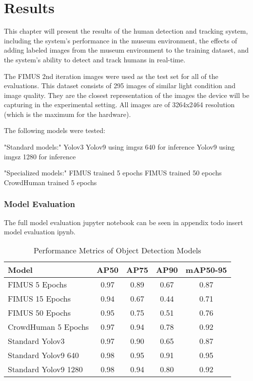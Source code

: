 \section{Results}
\label{sec:results}
This chapter will present the results of the human detection and tracking system, including the system's performance in the museum environment, the effects of adding labeled images from the museum environment to the training dataset, and the system's ability to detect and track humans in real-time.

The FIMUS 2nd iteration images were used as the test set for all of the evaluations. This dataset consists of 295 images of similar light condition and image quality. They are the closest representation of the images the device will be capturing in the experimental setting. All images are of 3264x2464 resolution (which is the maximum for the hardware).

The following models were tested:

"Standard models:"
	Yolov3
	Yolov9 using imgsz 640 for inference
	Yolov9 using imgsz 1280 for inference

"Specialized models:"
	FIMUS trained 5 epochs
	FIMUS trained 50 epochs
	CrowdHuman trained 5 epochs




\subsubsection*{Model Evaluation}
The full model evaluation jupyter notebook can be seen in appendix todo insert model evaluation ipynb.

\begin{table}[H]
    \centering
    \renewcommand{\arraystretch}{1.5} %
    \setlength{\tabcolsep}{1em}
    \begin{tabular}{|l|c|c|c|c|}
        \hline
        \rowcolor{gray!25}
        \textbf{Model} & \textbf{AP50} & \textbf{AP75} & \textbf{AP90} & \textbf{mAP50-95} \\ \hline
        FIMUS 5 Epochs       & 0.97 & 0.89 & 0.67 & 0.87 \\ \hline
        FIMUS 15 Epochs      & 0.94 & 0.67 & 0.44 & 0.71 \\ \hline
        FIMUS 50 Epochs      & 0.95 & 0.75 & 0.51 & 0.76 \\ \hline
        CrowdHuman 5 Epochs  & 0.97 & 0.94 & 0.78 & 0.92 \\ \hline
        Standard Yolov3      & 0.97 & 0.90 & 0.65 & 0.87 \\ \hline
        Standard Yolov9 640  & 0.98 & 0.95 & 0.91 & 0.95 \\ \hline
        Standard Yolov9 1280 & 0.98 & 0.94 & 0.80 & 0.92 \\ \hline
    \end{tabular}
    \caption{\centering Performance Metrics of Object Detection Models}
    \label{tab:performance_metrics}
\end{table}



\label{sec:results_heatmaps}